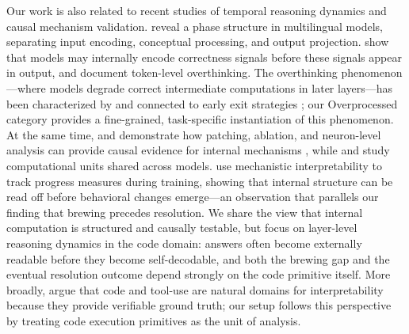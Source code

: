 Our work is also related to recent studies of temporal reasoning dynamics and causal mechanism validation.
\citet{wendler2024llamas} reveal a phase structure in multilingual models, separating input encoding, conceptual processing, and output projection.
\citet{selfverify2025} show that models may internally encode correctness signals before these signals appear in output, and document token-level overthinking.
The overthinking phenomenon---where models degrade correct intermediate computations in later layers---has been characterized by \citet{halawi2024overthinking} and connected to early exit strategies \citep{schuster2022confident}; our Overprocessed category provides a fine-grained, task-specific instantiation of this phenomenon.
At the same time, \citet{wang2022ioi} and \citet{nikankin2025arithmetic} demonstrate how patching, ablation, and neuron-level analysis can provide causal evidence for internal mechanisms \citep{meng2022locating, geiger2023causal}, while \citet{universalneurons2024} and \citet{gould2024successor} study computational units shared across models.
\citet{nanda2023grokking} use mechanistic interpretability to track progress measures during training, showing that internal structure can be read off before behavioral changes emerge---an observation that parallels our finding that brewing precedes resolution.
We share the view that internal computation is structured and causally testable, but focus on layer-level reasoning dynamics in the code domain: answers often become externally readable before they become self-decodable, and both the brewing gap and the eventual resolution outcome depend strongly on the code primitive itself.
More broadly, \citet{nanda2025pragmatic} argue that code and tool-use are natural domains for interpretability because they provide verifiable ground truth; our setup follows this perspective by treating code execution primitives as the unit of analysis.
